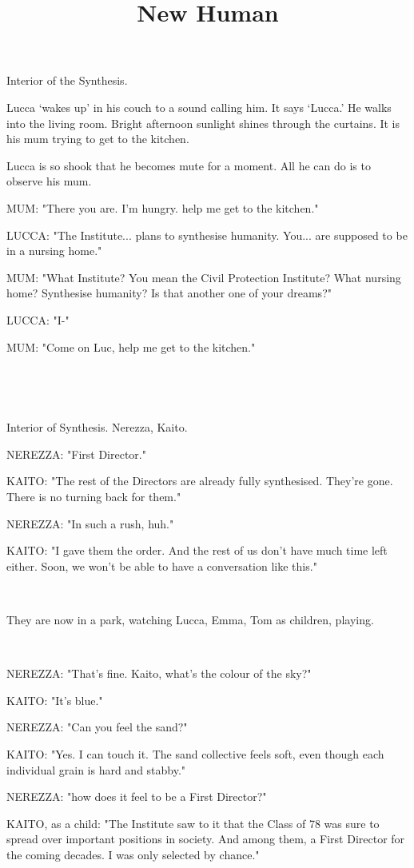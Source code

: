 \documentclass[11pt]{article}
\begin{document}
\ttfamily
\title{New Human}
\maketitle

Interior of the Synthesis.


Lucca `wakes up' in his couch to a sound calling him. 
It says `Lucca.'
He walks into the living room. 
Bright afternoon sunlight shines through the curtains.
It is his mum trying to get to the kitchen.

Lucca is so shook that he becomes mute for a moment.
All he can do is to observe his mum.

MUM: "There you are.
I'm hungry.
help me get to the kitchen."

LUCCA: "The Institute... plans to synthesise humanity.
You... are supposed to be in a nursing home."

MUM: "What Institute? You mean the Civil Protection Institute? What nursing home?
Synthesise humanity?
Is that another one of your dreams?"

LUCCA: "I-"

MUM: "Come on Luc, help me get to the kitchen."

\ 

\ 

Interior of Synthesis.
Nerezza, Kaito. 

NEREZZA: "First Director."

KAITO: "The rest of the Directors are already fully synthesised. 
They're gone.
There is no turning back for them."

NEREZZA: "In such a rush, huh."

KAITO: "I gave them the order.
And the rest of us don't have much time left either.
Soon, we won't be able to have a conversation like this."

\ 

They are now in a park, watching Lucca, Emma, Tom as children, playing.

\ 

NEREZZA: "That's fine.
Kaito, what's the colour of the sky?"

KAITO: "It's blue."

NEREZZA: "Can you feel the sand?"

KAITO: "Yes. I can touch it.
The sand collective feels soft, even though each individual grain is hard and stabby."

NEREZZA: "how does it feel to be a First Director?"

KAITO, as a child: "The Institute saw to it that the Class of 78 was sure to spread over important positions in society. 
And among them, a First Director for the coming decades.
I was only selected by chance."
\end{document}
